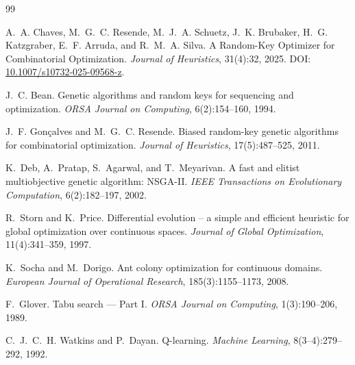 \documentclass[11pt,a4paper]{article}
\begin{document}
\begin{thebibliography}{99}

A.~A. Chaves, M.~G.~C. Resende, M.~J.~A. Schuetz, J.~K. Brubaker, H.~G. Katzgraber, E.~F. Arruda, and R.~M.~A. Silva.
\newblock A Random-Key Optimizer for Combinatorial Optimization.
\newblock \emph{Journal of Heuristics}, 31(4):32, 2025.
\newblock DOI: \href{https://doi.org/10.1007/s10732-025-09568-z}{10.1007/s10732-025-09568-z}.

J.~C. Bean.
\newblock Genetic algorithms and random keys for sequencing and optimization.
\newblock \emph{ORSA Journal on Computing}, 6(2):154--160, 1994.

J.~F. Gon{\c{c}}alves and M.~G.~C. Resende.
\newblock Biased random-key genetic algorithms for combinatorial optimization.
\newblock \emph{Journal of Heuristics}, 17(5):487--525, 2011.

K.~Deb, A.~Pratap, S.~Agarwal, and T.~Meyarivan.
\newblock A fast and elitist multiobjective genetic algorithm: NSGA-II.
\newblock \emph{IEEE Transactions on Evolutionary Computation}, 6(2):182--197, 2002.

R.~Storn and K.~Price.
\newblock Differential evolution -- a simple and efficient heuristic for global optimization over continuous spaces.
\newblock \emph{Journal of Global Optimization}, 11(4):341--359, 1997.

K.~Socha and M.~Dorigo.
\newblock Ant colony optimization for continuous domains.
\newblock \emph{European Journal of Operational Research}, 185(3):1155--1173, 2008.

F.~Glover.
\newblock Tabu search --- Part I.
\newblock \emph{ORSA Journal on Computing}, 1(3):190--206, 1989.

C.~J.~C.~H. Watkins and P.~Dayan.
\newblock Q-learning.
\newblock \emph{Machine Learning}, 8(3--4):279--292, 1992.

\end{thebibliography}
\end{document}
